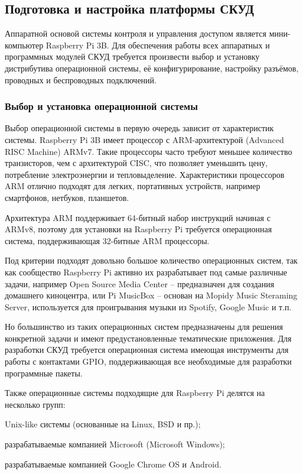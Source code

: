 \subsection{Подготовка и настройка платформы СКУД}

Аппаратной основой системы контроля и управления доступом является мини-компьютер Raspberry Pi 3B. Для обеспечения работы всех аппаратных и программных модулей СКУД требуется произвести выбор и установку дистрибутива операционной системы, её конфигурирование, настройку разъёмов, проводных и беспроводных подключений.

\subsubsection{Выбор и установка операционной системы}

Выбор операционной системы в первую очередь зависит от характеристик системы. Raspberry Pi 3B имеет процессор с ARM-архитектурой (Advanced RISC Machine) ARMv7. Такие процессоры часто требуют меньшее количество транзисторов, чем с архитектурой CISC, что позволяет уменьшить цену, потребление электроэнергии и тепловыделение. Характеристики процессоров  ARM отлично подходят для легких, портативных устройств, например смартфонов, нетбуков, планшетов. 

Архитектура ARM поддерживает 64-битный набор инструкций начиная с ARMv8, поэтому для установки на Raspberry Pi требуется операционная система, поддерживающая 32-битные ARM процессоры.

Под критерии подходят довольно большое количество операционных систем, так как сообщество Raspberry Pi активно их разрабатывает под самые различные задачи, например Open Source Media Center -- предназначен для создания домашнего киноцентра, или Pi MusicBox -- основан на Mopidy Music Steraming Server, используется для проигрывания музыки из Spotify, Google Music и т.п.

Но большинство из таких операционных систем предназначены для решения конкретной задачи и имеют предустановленные тематические приложения. Для разработки СКУД требуется операционная система имеющая инструменты для работы с контактами GPIO, поддерживающая все необходимые для разработки программные пакеты.

Также операционные системы подходящие для Raspberry Pi делятся на несколько групп: 
\begin{itemize*}
\item Unix-like системы (основанные на Linux, BSD и пр.);
\item разрабатываемые компанией Microsoft (Microsoft Windows);
\item разрабатываемые компанией Google Chrome OS и Android.
\end{itemize*}

